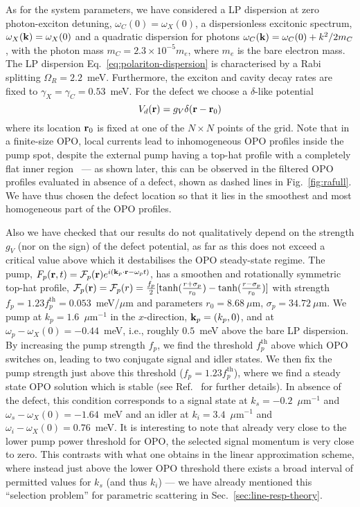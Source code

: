 As for the system parameters, we have considered a LP dispersion at
zero photon-exciton detuning, $\omega_C(0) = \omega_X(0)$, a
dispersionless excitonic spectrum, $\omega_X({\mathbf{k}}) = \omega_X(0)$
and a quadratic dispersion for photons
$\omega_C({\mathbf{k}}) = \omega_C(0) + k^2/2m_C$, with the photon mass
$m_C=2.3 \times 10^{-5} m_e$, where $m_e$ is the bare electron
mass. The LP dispersion Eq.~\eqref{eq:polariton-dispersion} is
characterised by a Rabi splitting $\Omega_R = 2.2$~meV. Furthermore,
the exciton and cavity decay rates are fixed to
$\gamma_X=\gamma_C=0.53$~meV.
%
For the defect we choose a $\delta$-like potential
%
\begin{equation}
  V_d(\mathbf{r}) = g_V \delta(\mathbf{r} - \mathbf{r}_0)
\end{equation}
%
where its location $\mathbf{r}_0$ is fixed at one of the $N \times N$
points of the grid.
%
Note that in a finite-size OPO, local currents lead to inhomogeneous
OPO profiles inside the pump spot, despite the external pump having
a top-hat profile with a completely flat inner
region~\cite{Marchetti_2010,9783642241857} --- as shown later, this
can be observed in the filtered OPO profiles evaluated in absence of a
defect, shown as dashed lines in Fig.~\ref{fig:rafull}.
%
We have thus chosen the defect location so that it lies in the
smoothest and most homogeneous part of the OPO profiles.

Also we have checked that our results do not qualitatively depend on
the strength $g_V$ (nor on the sign) of the defect potential, as far
as this does not exceed a critical value above which it destabilises
the OPO steady-state regime.
%
The pump, $F_p(\mathbf{r},t) = \mathcal{F}_p(\mathbf{r}) e^{i (\mathbf{k}_p
  \cdot \mathbf{r} - \omega_p t)}$, has a smoothen and rotationally
symmetric top-hat profile, $\mathcal{F}_p(\mathbf{r}) = \mathcal{F}_p(r)
= \frac{f_p}{2}[\tanh(\frac{r+\sigma_p}{r_0}) -
  \tanh(\frac{r-\sigma_p}{r_0})]$ with strength $f_p = 1.23
f_p^\text{th} = 0.053$~meV/$\mu$m and parameters $r_0 = 8.68~\mu$m,
$\sigma_p = 34.72~\mu$m.
%
We pump at $k_p=1.6$~$\mu$m$^{-1}$ in the $x$-direction, $\mathbf{k}_p =
(k_p,0)$, and at $\omega_p-\omega_X(0)=-0.44$~meV, i.e., roughly
$0.5$~meV above the bare LP dispersion. By increasing the pump
strength $f_p$, we find the threshold $f_p^{\text{th}}$ above which
OPO switches on, leading to two conjugate signal and idler states.
%
We then fix the pump strength just above this threshold ($f_p=1.23
f_p^{\text{th}}$), where we find a steady state OPO solution which is
stable (see Ref.~\cite{9783642241857} for further details). In
absence of the defect, this condition corresponds to a signal state at
$k_s=-0.2$~$\mu$m$^{-1}$ and $\omega_s-\omega_X(0) = -1.64$~meV and an
idler at $k_i=3.4$~$\mu$m$^{-1}$ and $\omega_i-\omega_X(0) =
0.76$~meV. 
%
It is interesting to note that already very close to the lower pump
power threshold for OPO, the selected signal momentum is very close to
zero. This contrasts with what one obtains in the linear approximation
scheme, where instead just above the lower OPO threshold there exists
a broad interval of permitted values for $k_s$ (and thus $k_i$) --- we
have already mentioned this ``selection problem'' for parametric
scattering in Sec.~\ref{sec:line-resp-theory}.

